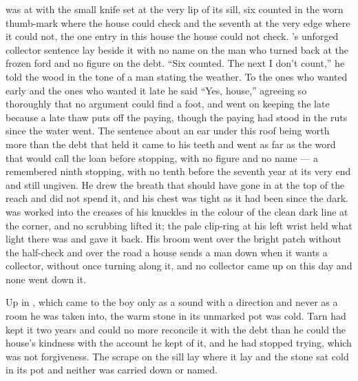  was at  with the small knife set at the very lip of its sill, six counted in the worn thumb-mark where the house could check and the seventh at the very edge where it could not, the one entry in this house the house could not check. 's unforged collector sentence lay beside it with no name on the man who turned back at the frozen ford and no figure on the debt. “Six counted. The next I don't count,” he told the wood in the tone of a man stating the weather. To the ones who wanted  early and the ones who wanted it late he said “Yes, house,” agreeing so thoroughly that no argument could find a foot, and went on keeping the late because a late thaw puts off the paying, though the paying had stood in the ruts since the water went. The sentence about an ear under this roof being worth more than the debt that held it came to his teeth and went as far as the word that would call the loan before stopping, with no figure and no name --- a remembered ninth stopping, with no tenth before the seventh year at its very end and still ungiven. He drew the breath that should have gone in at the top of the reach and did not spend it, and his chest was tight as it had been since the dark.  was worked into the creases of his knuckles in the colour of the clean dark line at the corner, and no scrubbing lifted it; the pale clip-ring at his left wrist held what light there was and gave it back. His broom went over the bright patch without the half-check and over the road a house sends a man down when it wants a collector, without once turning along it, and no collector came up  on this day and none went down it.

Up in , which came to the boy only as a sound with a direction and never as a room he was taken into, the warm stone in its unmarked pot was cold. Tarn had kept it two years and could no more reconcile it with the debt than he could the house's kindness with the account he kept of it, and he had stopped trying, which was not forgiveness. The scrape on the sill lay where it lay and the stone sat cold in its pot and neither was carried down or named.


